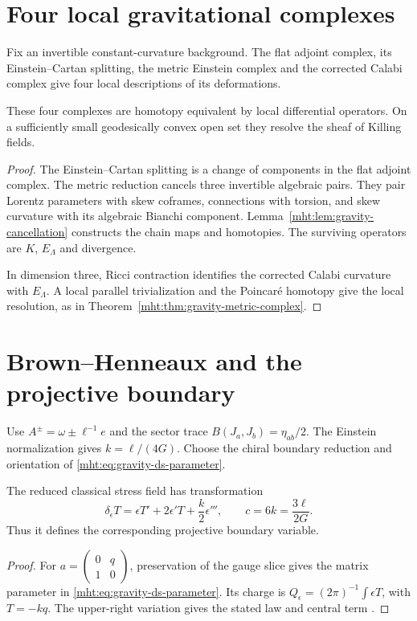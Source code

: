 \chapter{Four local gravitational complexes}
Fix an invertible constant-curvature background.
The flat adjoint complex, its Einstein--Cartan splitting, the
metric Einstein complex and the corrected Calabi complex give
four local descriptions of its deformations.

\begin{theorem}
These four complexes are homotopy equivalent by local
differential operators.
On a sufficiently small geodesically convex open set they
resolve the sheaf of Killing fields.
\end{theorem}
\begin{proof}
The Einstein--Cartan splitting is a change of components in
the flat adjoint complex.
The metric reduction cancels three invertible algebraic pairs.
They pair Lorentz parameters with skew coframes, connections
with torsion, and skew curvature with its algebraic Bianchi component.
Lemma~\ref{mht:lem:gravity-cancellation} constructs the chain maps
and homotopies.
The surviving operators are $K$, $E_\Lambda$ and divergence.

In dimension three, Ricci contraction identifies the corrected
Calabi curvature with $E_\Lambda$.
A local parallel trivialization and the Poincar\'e homotopy
give the local resolution, as in
Theorem~\ref{mht:thm:gravity-metric-complex}.
\end{proof}

\chapter{Brown--Henneaux and the projective boundary}
Use $A^\pm=\omega\pm\ell^{-1}e$ and the sector trace
$B(J_a,J_b)=\eta_{ab}/2$.
The Einstein normalization gives $k=\ell/(4G)$.
Choose the chiral boundary reduction and orientation of
\eqref{mht:eq:gravity-ds-parameter}.

\begin{theorem}
The reduced classical stress field has transformation
\[
 \delta_\epsilon T=\epsilon T'+2\epsilon'T+\frac{k}{2}\epsilon''',
 \qquad c=6k=\frac{3\ell}{2G}.
\]
Thus it defines the corresponding projective boundary variable.
\end{theorem}
\begin{proof}
For $a=\left(\begin{smallmatrix}0&q\\1&0\end{smallmatrix}\right)$,
preservation of the gauge slice gives the matrix parameter
in \eqref{mht:eq:gravity-ds-parameter}.
Its charge is $Q_\epsilon=(2\pi)^{-1}\int\epsilon T$, with $T=-kq$.
The upper-right variation gives the stated law and central term
\cite{BrownHenneaux}.
\end{proof}

